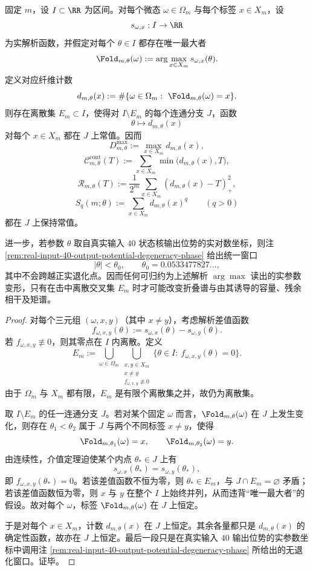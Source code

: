 \begin{proposition}[解析读出腔室内的折叠谱刚性]\label{prop:xi-time-part9m3-analytic-chamber-rigidity-sampling-readout}
固定 \(m\)，设 \(I\subset\RR\) 为区间。对每个微态 \(\omega\in\Omega_m\) 与每个标签 \(x\in X_m\)，设
\[
s_{\omega,x}:I\to\RR
\]
为实解析函数，并假定对每个 \(\theta\in I\) 都存在唯一最大者
\[
\Fold_{m,\theta}(\omega):=
\arg\max_{x\in X_m}s_{\omega,x}(\theta).
\]
定义对应纤维计数
\[
d_{m,\theta}(x):=
\#\{\omega\in\Omega_m:\ \Fold_{m,\theta}(\omega)=x\}.
\]
则存在离散集 \(E_m\subset I\)，使得对 \(I\setminus E_m\) 的每个连通分支 \(J\)，函数
\[
\theta\longmapsto d_{m,\theta}(x)
\]
对每个 \(x\in X_m\) 都在 \(J\) 上常值。因而
\[
D_{m,\theta}^{\max}:=\max_{x\in X_m}d_{m,\theta}(x),
\]
\[
\mathcal C_{m,\theta}^{\mathrm{cont}}(T):=
\sum_{x\in X_m}\min\bigl(d_{m,\theta}(x),T\bigr),
\]
\[
\mathscr R_{m,\theta}(T):=
\frac1{2^m}\sum_{x\in X_m}(d_{m,\theta}(x)-T)_+^2,
\]
\[
S_q(m;\theta):=\sum_{x\in X_m}d_{m,\theta}(x)^q
\qquad
(q>0)
\]
都在 \(J\) 上保持常值。

进一步，若参数 \(\theta\) 取自真实输入 \(40\) 状态核输出位势的实对数坐标，则注 \ref{rem:real-input-40-output-potential-degeneracy-phase} 给出统一窗口
\[
|\theta|<\theta_0,
\qquad
\theta_0=0.0533477827\ldots,
\]
其中不会跨越正实退化点。因而任何可归约为上述解析 \(\arg\max\) 读出的实参数变形，只有在击中离散交叉集 \(E_m\) 时才可能改变折叠谱与由其诱导的容量、残余相干及矩谱。
\end{proposition}
\begin{proof}
对每个三元组 \((\omega,x,y)\)（其中 \(x\neq y\)），考虑解析差值函数
\[
f_{\omega,x,y}(\theta):=s_{\omega,x}(\theta)-s_{\omega,y}(\theta).
\]
若 \(f_{\omega,x,y}\not\equiv 0\)，则其零点在 \(I\) 内离散。定义
\[
E_m:=
\bigcup_{\omega\in\Omega_m}
\bigcup_{\substack{x,y\in X_m\\ x\neq y\\ f_{\omega,x,y}\not\equiv 0}}
\{\theta\in I:\ f_{\omega,x,y}(\theta)=0\}.
\]
由于 \(\Omega_m\) 与 \(X_m\) 都有限，\(E_m\) 是有限个离散集之并，故仍为离散集。

取 \(I\setminus E_m\) 的任一连通分支 \(J\)。若对某个固定 \(\omega\) 而言，\(\Fold_{m,\theta}(\omega)\) 在 \(J\) 上发生变化，则存在 \(\theta_1<\theta_2\) 属于 \(J\) 与两个不同标签 \(x\neq y\)，使得
\[
\Fold_{m,\theta_1}(\omega)=x,
\qquad
\Fold_{m,\theta_2}(\omega)=y.
\]
由连续性，介值定理迫使某个内点 \(\theta_\ast\in J\) 上有
\[
s_{\omega,x}(\theta_\ast)=s_{\omega,y}(\theta_\ast),
\]
即 \(f_{\omega,x,y}(\theta_\ast)=0\)。若该差值函数不恒为零，则 \(\theta_\ast\in E_m\)，与 \(J\cap E_m=\varnothing\) 矛盾；若该差值函数恒为零，则 \(x\) 与 \(y\) 在整个 \(I\) 上始终并列，从而违背“唯一最大者”的假设。故对每个 \(\omega\)，标签 \(\Fold_{m,\theta}(\omega)\) 在 \(J\) 上恒定。

于是对每个 \(x\in X_m\)，计数 \(d_{m,\theta}(x)\) 在 \(J\) 上恒定。其余各量都只是 \(d_{m,\theta}(x)\) 的确定性函数，故亦在 \(J\) 上恒定。最后一段只是在真实输入 \(40\) 输出位势的实参数坐标中调用注 \ref{rem:real-input-40-output-potential-degeneracy-phase} 所给出的无退化窗口。证毕。
\end{proof}

\endinput

